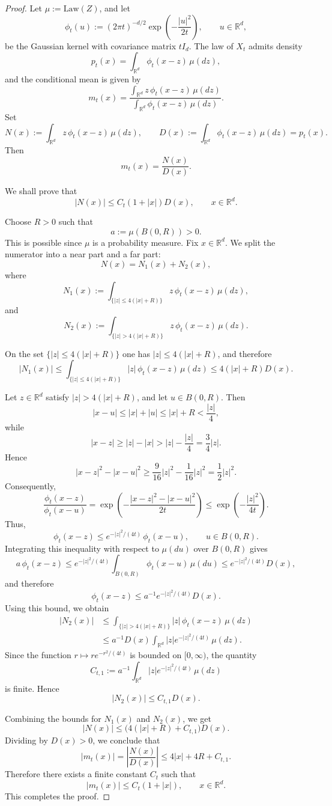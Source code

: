 \documentclass[10pt,a4paper]{amsart}
\begin{document}
\begin{proof}
Let $\mu:=\mathrm{Law}(Z)$, and let
\[
\phi_t(u):=(2\pi t)^{-d/2}\exp\!\left(-\frac{|u|^2}{2t}\right),\qquad u\in\mathbb R^d,
\]
be the Gaussian kernel with covariance matrix $tI_d$. The law of $X_t$ admits density
\[
p_t(x)=\int_{\mathbb R^d}\phi_t(x-z)\,\mu(dz),
\]
and the conditional mean is given by
\[
m_t(x)
=
\frac{\int_{\mathbb R^d} z\,\phi_t(x-z)\,\mu(dz)}
{\int_{\mathbb R^d}\phi_t(x-z)\,\mu(dz)}.
\]
Set
\[
N(x):=\int_{\mathbb R^d} z\,\phi_t(x-z)\,\mu(dz),
\qquad
D(x):=\int_{\mathbb R^d}\phi_t(x-z)\,\mu(dz)=p_t(x).
\]
Then
\[
m_t(x)=\frac{N(x)}{D(x)}.
\]

We shall prove that
\[
|N(x)|\le C_t(1+|x|)D(x),\qquad x\in\mathbb R^d.
\]

Choose $R>0$ such that
\[
a:=\mu(B(0,R))>0.
\]
This is possible since $\mu$ is a probability measure. Fix $x\in\mathbb R^d$. We split the numerator into a near part and a far part:
\[
N(x)=N_1(x)+N_2(x),
\]
where
\[
N_1(x):=\int_{\{|z|\le 4(|x|+R)\}} z\,\phi_t(x-z)\,\mu(dz),
\]
and
\[
N_2(x):=\int_{\{|z|>4(|x|+R)\}} z\,\phi_t(x-z)\,\mu(dz).
\]

\medskip

On the set $\{|z|\le 4(|x|+R)\}$ one has $|z|\le 4(|x|+R)$, and therefore
\[
|N_1(x)|
\le \int_{\{|z|\le 4(|x|+R)\}} |z|\,\phi_t(x-z)\,\mu(dz)
\le 4(|x|+R)D(x).
\]

\medskip

Let $z\in\mathbb R^d$ satisfy $|z|>4(|x|+R)$, and let $u\in B(0,R)$. Then
\[
|x-u|\le |x|+|u|\le |x|+R<\frac{|z|}{4},
\]
while
\[
|x-z|\ge |z|-|x|>|z|-\frac{|z|}{4}=\frac{3}{4}|z|.
\]
Hence
\[
|x-z|^2-|x-u|^2
\ge \frac{9}{16}|z|^2-\frac{1}{16}|z|^2
=\frac12 |z|^2.
\]
Consequently,
\[
\frac{\phi_t(x-z)}{\phi_t(x-u)}
=
\exp\!\left(-\frac{|x-z|^2-|x-u|^2}{2t}\right)
\le \exp\!\left(-\frac{|z|^2}{4t}\right).
\]
Thus,
\[
\phi_t(x-z)\le e^{-|z|^2/(4t)}\,\phi_t(x-u),\qquad u\in B(0,R).
\]
Integrating this inequality with respect to $\mu(du)$ over $B(0,R)$ gives
\[
a\,\phi_t(x-z)
\le e^{-|z|^2/(4t)}\int_{B(0,R)}\phi_t(x-u)\,\mu(du)
\le e^{-|z|^2/(4t)}D(x),
\]
and therefore
\[
\phi_t(x-z)\le a^{-1}e^{-|z|^2/(4t)}D(x).
\]
Using this bound, we obtain
\begin{align*}
|N_2(x)|
&\le \int_{\{|z|>4(|x|+R)\}} |z|\,\phi_t(x-z)\,\mu(dz)\\
&\le a^{-1}D(x)\int_{\mathbb R^d}|z|e^{-|z|^2/(4t)}\,\mu(dz).
\end{align*}
Since the function $r\mapsto re^{-r^2/(4t)}$ is bounded on $[0,\infty)$, the quantity
\[
C_{t,1}:=a^{-1}\int_{\mathbb R^d}|z|e^{-|z|^2/(4t)}\,\mu(dz)
\]
is finite. Hence
\[
|N_2(x)|\le C_{t,1}D(x).
\]

\medskip
Combining the bounds for $N_1(x)$ and $N_2(x)$, we get
\[
|N(x)|
\le \bigl(4(|x|+R)+C_{t,1}\bigr)D(x).
\]
Dividing by $D(x)>0$, we conclude that
\[
|m_t(x)|
=
\left|\frac{N(x)}{D(x)}\right|
\le 4|x|+4R+C_{t,1}.
\]
Therefore there exists a finite constant $C_t$ such that
\[
|m_t(x)|\le C_t(1+|x|),\qquad x\in\mathbb R^d.
\]
This completes the proof.
\end{proof}
\end{document}
